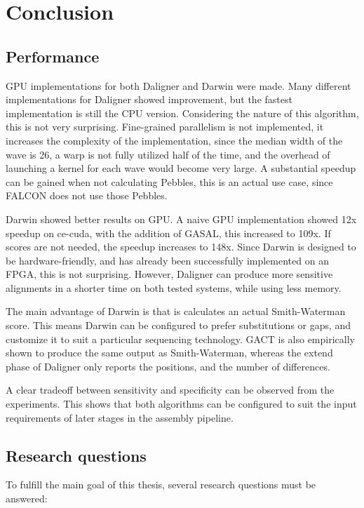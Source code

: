 \documentclass[../thesis.tex]{subfiles}
\begin{document}
\chapter{Conclusion}
\ifdefined\main
\else

\fi

\section{Performance}
GPU implementations for both Daligner and Darwin were made.
Many different implementations for Daligner showed improvement, but the fastest implementation is still the CPU version.
Considering the nature of this algorithm, this is not very surprising.
Fine-grained parallelism is not implemented, it increases the complexity of the implementation, since the median width of the wave is 26, a warp is not fully utilized half of the time, and the overhead of launching a kernel for each wave would become very large.
A substantial speedup can be gained when not calculating Pebbles, this is an actual use case, since FALCON does not use those Pebbles.

Darwin showed better results on GPU.
A naive GPU implementation showed 12x speedup on ce-cuda, with the addition of GASAL, this increased to 109x.
If scores are not needed, the speedup increases to 148x.
Since Darwin is designed to be hardware-friendly, and has already been successfully implemented on an FPGA, this is not surprising.
However, Daligner can produce more sensitive alignments in a shorter time on both tested systems, while using less memory.

The main advantage of Darwin is that is calculates an actual Smith-Waterman score.
This means Darwin can be configured to prefer substitutions or gaps, and customize it to suit a particular sequencing technology.
GACT is also empirically shown to produce the same output as Smith-Waterman, whereas the extend phase of Daligner only reports the positions, and the number of differences.

A clear tradeoff between sensitivity and specificity can be observed from the experiments.
This shows that both algorithms can be configured to suit the input requirements of later stages in the assembly pipeline.

\section{Research questions}
To fulfill the main goal of this thesis, several research questions must be answered:
\end{document}
